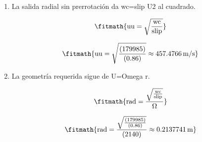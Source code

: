 \begin{enumerate}

\item La salida radial sin prerrotación da wc=slip U2 al cuadrado.

\[\fitmath{\mathrm{uu}=\sqrt{\frac{\mathrm{wc}}{\mathrm{slip}}}}\]

\[\fitmath{\mathrm{uu}=\sqrt{\frac{(179985)}{(0.86)}}\approx 457.4766\,\mathrm{m/s}}\]

\item La geometría requerida sigue de U=Omega r.

\[\fitmath{\mathrm{rad}=\frac{\sqrt{\frac{\mathrm{wc}}{\mathrm{slip}}}}{\Omega}}\]

\[\fitmath{\mathrm{rad}=\frac{\sqrt{\frac{(179985)}{(0.86)}}}{(2140)}\approx 0.2137741\,\mathrm{m}}\]

\end{enumerate}
